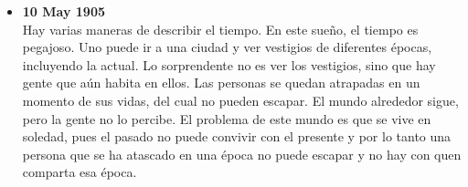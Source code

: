 \documentclass[12pt,a4paper]{report}
\begin{document}
\begin{itemize}
{\begin{itemize}[label=$\bullet$]
{            Luego, la gente comienza a dejar de ir a trabajar. ¿Para qué
            trabajar para alguién más si de todas maneras todo va a terminar?\\
            A la gente le deja de importar el dinero y empieza a apreciar el
            tiempo que queda. Ya no corre sino que disfruta cada momento.
            Vecinos que nunca se hablaron, ahora conversan cómo mejores amigos
            padres e hijos intentan recuperar aquella relación que dejaron que
            el tiempo marchitara, etc.\\
            En los últimos momentos, la humanidad se une para recibir el fin
            cómo uno.
        }
        \item{\textbf{10 May 1905}\\
            Hay varias maneras de describir el tiempo. En este sueño, el tiempo
            es pegajoso. Uno puede ir a una ciudad y ver vestigios de diferentes
            épocas, incluyendo la actual. Lo sorprendente no es ver los
            vestigios, sino que hay gente que aún habita en ellos. Las personas
            se quedan atrapadas en un momento de sus vidas, del cual no pueden
            escapar. El mundo alrededor sigue, pero la gente no lo percibe. El
            problema de este mundo es que se vive en soledad, pues el pasado no
            puede convivir con el presente y por lo tanto una persona que se ha
            atascado en una época no puede escapar y no hay con quen comparta
            esa época.
        }
    \end{itemize}
}
\end{itemize}
\end{document}
